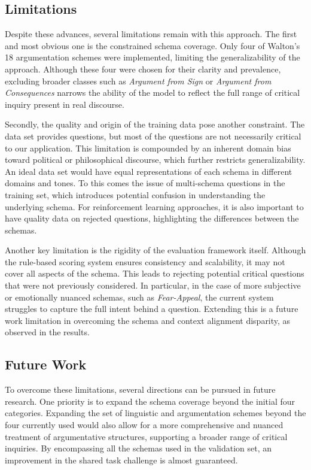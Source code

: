\documentclass[11pt]{article}
\begin{document}
\subsection{Limitations}
Despite these advances, several limitations remain with this approach. The first and most obvious one is the constrained schema coverage. Only four of Walton’s 18 argumentation schemes were implemented, limiting the generalizability of the approach. Although these four were chosen for their clarity and prevalence, excluding broader classes such as \textit{Argument from Sign} or \textit{Argument from Consequences} narrows the ability of the model to reflect the full range of critical inquiry present in real discourse.

Secondly, the quality and origin of the training data pose another constraint. The data set provides questions, but most of the questions are not necessarily critical to our application. This limitation is compounded by an inherent domain bias toward political or philosophical discourse, which further restricts generalizability. An ideal data set would have equal representations of each schema in different domains and tones. To this comes the issue of multi-schema questions in the training set, which introduces potential confusion in understanding the underlying schema. For reinforcement learning approaches, it is also important to have quality data on rejected questions, highlighting the differences between the schemas. 

Another key limitation is the rigidity of the evaluation framework itself. Although the rule-based scoring system ensures consistency and scalability, it may not cover all aspects of the schema. This leads to rejecting potential critical questions that were not previously considered. In particular, in the case of more subjective or emotionally nuanced schemas, such as \textit{Fear-Appeal}, the current system struggles to capture the full intent behind a question. Extending this is a future work limitation in overcoming the schema and context alignment disparity, as observed in the results.

\subsection{Future Work}
To overcome these limitations, several directions can be pursued in future research. One priority is to expand the schema coverage beyond the initial four categories. Expanding the set of linguistic and argumentation schemes beyond the four currently used would also allow for a more comprehensive and nuanced treatment of argumentative structures, supporting a broader range of critical inquiries. By encompassing all the schemas used in the validation set, an improvement in the shared task challenge is almost guaranteed.
\end{document}
